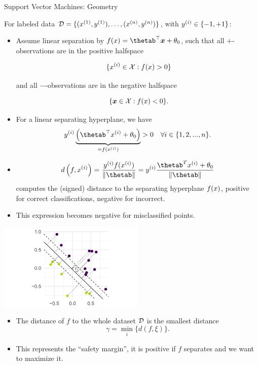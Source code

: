 \begin{vbframe}{Support Vector Machines: Geometry}

For labeled data $\mathcal{D} = \{ (x^{(1)}, y^{(1)}), \ldots, (x^{(n)}, y^{(n)})\}$, with $y^{(i)} \in \{-1, +1\}$:
\begin{itemize}
  \item Assume linear separation by $\fx = \thetab^\top \xv + \theta_0$, such that all $+$-observations are in the positive halfspace

  $$
  \phantom{i}\{x^{(i)} \in \mathcal{X}: f(x) > 0\}
  $$

  and all $-$-observations are in the negative halfspace

  $$
  \phantom{i}\{\bm{x} \in \mathcal{X} : f(x) < 0\}.
  $$

  \item For a linear separating hyperplane, we have
  $$
    \yi \underbrace{\left(\thetab^\top \xi + \theta_0\right)}_{= \fxi} > 0 \quad \forall i \in \{1, 2, ..., n\}.
  $$

  \item 
  $$
    d \left(f, \xi \right) = \frac{\yi \fxi}{\|\thetab\|} = \yi \frac{\thetab^T \xi + \theta_0}{\|\thetab\|}
  $$
  computes the (signed) distance to the separating hyperplane $f(x)$,
    positive for correct classifications, negative for incorrect.
  \item This expression becomes negative for misclassified points.
\end{itemize}


\begin{center}
\includegraphics[width =7cm]{figure_man/svm-geometry01.png} \\
\end{center}


\framebreak

\begin{itemize}
    \item The distance of $f$ to the whole dataset $\mathcal{D}$
    is the smallest distance
    $$
    \gamma = \min\limits_i \Big\{ d \left(f, \xi \right) \Big\}.
    $$
    \item This represents the \enquote{safety margin}, it is positive if $f$ separates and we want to maximize it.
\end{itemize}



\end{vbframe}
